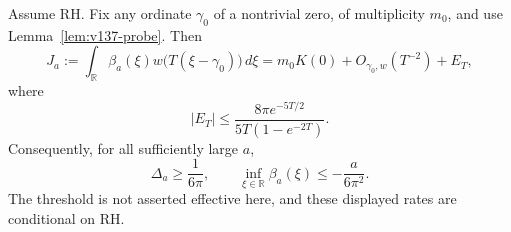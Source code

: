 \begin{proposition}
\label{prop:v137-conditional-mass}
Assume RH. Fix any ordinate $\gamma_0$ of a nontrivial zero, of
multiplicity $m_0$, and use Lemma~\ref{lem:v137-probe}. Then
\begin{equation}\label{eq:v137-probe-limit}
 J_a:=\int_{\mathbb R}\beta_a(\xi)
              w\bigl(T(\xi-\gamma_0)\bigr)\,d\xi
 =m_0K(0)+O_{\gamma_0,w}(T^{-2})+E_T,
\end{equation}
where
\begin{equation}\label{eq:v137-exterior-error}
 |E_T|\le\frac{8\pi e^{-5T/2}}{5T(1-e^{-2T})}.
\end{equation}
Consequently, for all sufficiently large $a$,
\begin{equation}\label{eq:v137-conditional-lower}
 \Delta_a\ge\frac1{6\pi},\qquad
 \inf_{\xi\in\mathbb R}\beta_a(\xi)
      \le-\frac{a}{6\pi^2}.
\end{equation}
The threshold is not asserted effective here, and these displayed rates
are conditional on RH.
\end{proposition}
